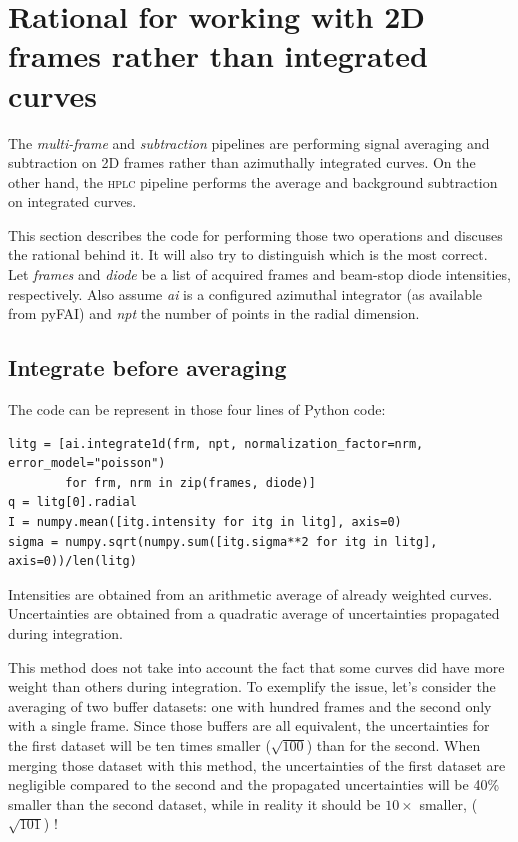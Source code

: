 \documentclass[preprint]{iucr}              %
\begin{document}
\section{Rational for working with 2D frames rather than integrated curves}
\label{rational}
The \textit{multi-frame} and \textit{subtraction} pipelines are performing signal averaging and subtraction on 2D frames rather than azimuthally integrated curves.
On the other hand, the \textsc{hplc} pipeline performs the average and background subtraction on integrated curves.

This section describes the code for performing those two operations and discuses the rational behind it.
It will also try to distinguish which is the most correct. 
Let \textit{frames} and \textit{diode} be a list of acquired frames and beam-stop diode intensities, respectively.
Also assume \textit{ai} is a configured azimuthal integrator (as available from pyFAI) and \textit{npt} the number of points in the radial dimension.

\subsection{Integrate before averaging}
The code can be represent in those four lines of Python code:
\begin{verbatim} 
litg = [ai.integrate1d(frm, npt, normalization_factor=nrm, error_model="poisson") 
        for frm, nrm in zip(frames, diode)]
q = litg[0].radial
I = numpy.mean([itg.intensity for itg in litg], axis=0)
sigma = numpy.sqrt(numpy.sum([itg.sigma**2 for itg in litg], axis=0))/len(litg)
\end{verbatim}

Intensities are obtained from an arithmetic average of already weighted curves.
Uncertainties are obtained from a quadratic average of uncertainties propagated during integration. 

This method does not take into account the fact that some curves did have more weight than others during integration.
To exemplify the issue, let's consider the averaging of two buffer datasets: one with hundred frames and the second only with a single frame.
Since those buffers are all equivalent, the uncertainties for the first dataset will be ten times smaller ($\sqrt{100}$) than for the second.
When merging those dataset with this method, the uncertainties of the first dataset are negligible compared to the second and the propagated uncertainties will be 40\% smaller than the second dataset, while in reality it should be $10\times$ smaller, ($\sqrt{101}$) ! 
\end{document}

